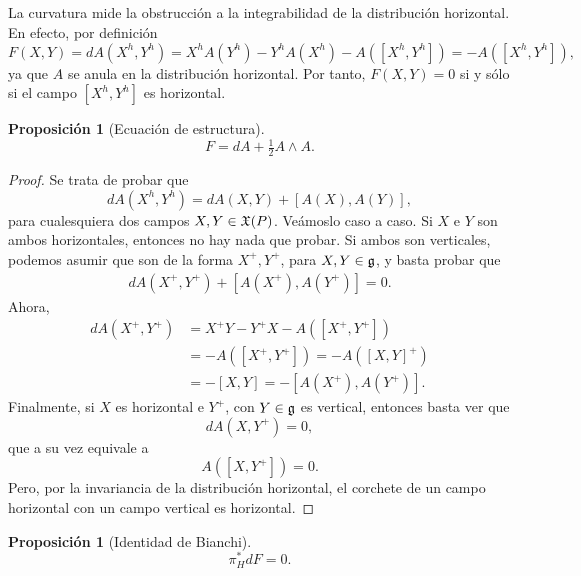 \documentclass[11pt,a4paper]{amsbook}
\newtheorem{prop}[subsection]{Proposición}
\theoremstyle{remark} \newtheorem{rmk}[subsection]{Observación}
\theoremstyle{definition} \newtheorem{defn}[subsection]{Definición}
\theoremstyle{definition} \newtheorem{ex}[subsection]{Ejemplo}
\theoremstyle{definition} \newtheorem{ej}[subsection]{Ejercicio}
\begin{document}
\subsection{} La curvatura mide la obstrucción a la integrabilidad de la distribución horizontal. En efecto, por definición
\begin{equation*}
F(X,Y) = dA(X^h,Y^h) = X^h A(Y^h) - Y^h A(X^h) - A([X^h,Y^h]) = - A([X^h,Y^h]),
\end{equation*}
ya que $A$ se anula en la distribución horizontal. Por tanto, $F(X,Y)=0$ si y sólo si el campo $[X^h,Y^h]$ es horizontal.

\begin{prop}[Ecuación de estructura]
\begin{equation*}
F = d A + \tfrac{1}{2} A \wedge A.
\end{equation*}
\end{prop}

\begin{proof}
  Se trata de probar que
  \begin{equation*}
dA( X^h,Y^h ) = dA(X,Y) + [A(X),A(Y)],
  \end{equation*}
  para cualesquiera dos campos $X,Y \in \mathfrak X(P)$. Veámoslo caso a caso. Si $X$ e $Y$ son ambos horizontales, entonces no hay nada que probar. Si ambos son verticales, podemos asumir que son de la forma $X^+, Y^+$, para $X,Y \in \mathfrak{g}$, y basta probar que
  \begin{align*}
dA(X^+, Y^+) + [A(X^+),A(Y^+)] = 0.
  \end{align*}
  Ahora,
  \begin{align*}
dA(X^+,Y^+) &= X^+ Y - Y^+ X - A([X^+, Y^+]) \\ & = -A([X^+,Y^+]) = -A([X,Y]^+)\\ &= -[X,Y] = -[A(X^+),A(Y^+)].
  \end{align*}
  Finalmente, si $X$ es horizontal e $Y^+$, con $Y\in \mathfrak{g}$ es vertical, entonces basta ver que
  \begin{equation*}
dA (X, Y^+) = 0,
  \end{equation*}
  que a su vez equivale a
  \begin{equation*}
A([X,Y^+]) = 0.
  \end{equation*}
  Pero, por la invariancia de la distribución horizontal, el corchete de un campo horizontal con un campo vertical es horizontal.
\end{proof}

\begin{prop}[Identidad de Bianchi]
\begin{equation*}
\pi^*_H dF = 0.
\end{equation*}
\end{prop}
\end{document}
